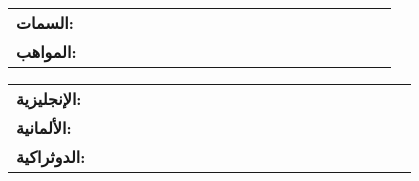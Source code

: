 \documentclass[a4paper]{article}
\begin{document}
\vspace*{-40pt}

\vspace*{-10pt}









\begin{tabular}{l p{0.8\linewidth}}
    \textbf{السمات:} & \\
    \textbf{المواهب:} & 
\end{tabular}

\begin{tabular}{l p{0.8\linewidth}}
    \textbf{الإنجليزية:} & \\
    \textbf{الألمانية:} & \\
    \textbf{الدوثراكية:} & 
\end{tabular}





%



\end{document}
